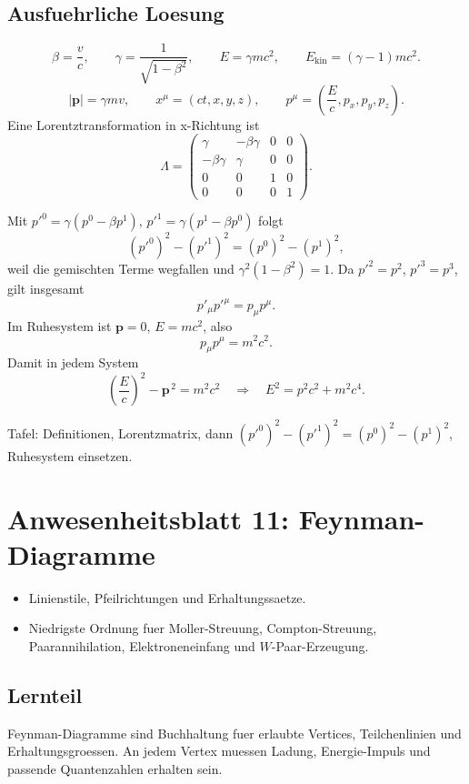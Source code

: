 \documentclass[11pt,a4paper]{scrartcl}
\newcommand{\vect}[1]{\bm{#1}}
\newcommand{\abs}[1]{\left|#1\right|}
\begin{document}
\subsection{Ausfuehrliche Loesung}
\begin{calculationbox}[title={Grundgroessen}]
\[\beta=\frac vc,\qquad \gamma=\frac{1}{\sqrt{1-\beta^2}},\qquad E=\gamma mc^2,\qquad E_{\mathrm{kin}}=(\gamma-1)mc^2.\]
\[\abs{\vect p}=\gamma mv,\qquad x^\mu=(ct,x,y,z),\qquad p^\mu=\left(\frac Ec,p_x,p_y,p_z\right).\]
Eine Lorentztransformation in x-Richtung ist
\[\Lambda=\begin{pmatrix}\gamma&-\beta\gamma&0&0\\-\beta\gamma&\gamma&0&0\\0&0&1&0\\0&0&0&1\end{pmatrix}.\]
\end{calculationbox}
\begin{calculationbox}[title={Invarianz}]
Mit \(p'^0=\gamma(p^0-\beta p^1)\), \(p'^1=\gamma(p^1-\beta p^0)\) folgt
\[(p'^0)^2-(p'^1)^2=(p^0)^2-(p^1)^2,\]
weil die gemischten Terme wegfallen und \(\gamma^2(1-\beta^2)=1\). Da \(p'^2=p^2\), \(p'^3=p^3\), gilt insgesamt
\[p'_\mu p'^\mu=p_\mu p^\mu.\]
Im Ruhesystem ist \(\vect p=0\), \(E=mc^2\), also
\[p_\mu p^\mu=m^2c^2.\]
Damit in jedem System
\[\left(\frac Ec\right)^2-\vect p^{\,2}=m^2c^2\quad\Rightarrow\quad \boxed{E^2=p^2c^2+m^2c^4}.\]
\end{calculationbox}
\begin{talkbox}Tafel: Definitionen, Lorentzmatrix, dann \((p'^0)^2-(p'^1)^2=(p^0)^2-(p^1)^2\), Ruhesystem einsetzen.\end{talkbox}


\section{Anwesenheitsblatt 11: Feynman-Diagramme}
\begin{taskbox}\begin{itemize}\item Linienstile, Pfeilrichtungen und Erhaltungssaetze.\item Niedrigste Ordnung fuer Moller-Streuung, Compton-Streuung, Paarannihilation, Elektroneneinfang und \(W\)-Paar-Erzeugung.\end{itemize}\end{taskbox}
\subsection{Lernteil}\begin{learningbox}Feynman-Diagramme sind Buchhaltung fuer erlaubte Vertices, Teilchenlinien und Erhaltungsgroessen. An jedem Vertex muessen Ladung, Energie-Impuls und passende Quantenzahlen erhalten sein.\end{learningbox}
\end{document}
